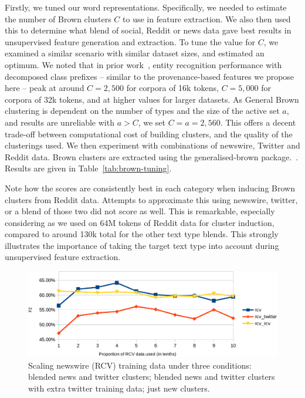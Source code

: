 \documentclass[10pt,journal,compsoc]{IEEEtran}
\begin{document}
Firstly, we tuned our word representations.
Specifically, we needed to estimate the number of Brown clusters $C$ to use in feature extraction.
We also then used this to determine what blend of social, Reddit or news data gave best results in unsupervised feature generation and extraction.
To tune the value for $C$, we examined a similar scenario with similar dataset sizes, and estimated an optimum.
We noted that in prior work~\cite{derczynski2015tune}, entity recognition performance with decomposed class prefixes -- similar to the provenance-based features we propose here -- peak at around $C=2,500$ for corpora of 16k tokens, $C=5,000$ for corpora of 32k tokens, and at higher values for larger datasets.
As General Brown clustering is dependent on the number of types and the size of the active set $a$, and results are unreliable with $a>C$, we set $C = a = 2,560$.
This offers a decent trade-off between computational cost of building clusters, and the quality of the clusterings used.
We then experiment with combinations of newswire, Twitter and Reddit data.
Brown clusters are extracted using the generalised-brown package.~\cite{sean_chester_2015_33758}.
Results are given in Table~\ref{tab:brown-tuning}.

Note how the scores are consistently best in each category when inducing Brown clusters from Reddit data.
Attempts to approximate this using newswire, twitter, or a blend of those two did not score as well.
This is remarkable, especially considering as we used on 64M tokens of Reddit data for cluster induction, compared to around 130k total for the other text type blends.
This strongly illustrates the importance of taking the target text type into account during unsupervised feature extraction.



\begin{figure}
\centering
\includegraphics[width=0.79\columnwidth]{entity-chunking/chart-results-rcv-crop.pdf}
\caption{Scaling newswire (RCV) training data under three conditions: blended news and twitter clusters; blended news and twitter clusters with extra twitter training data; just new clusters.}
\label{fig:rcv-scaling}
\end{figure}
\end{document}
